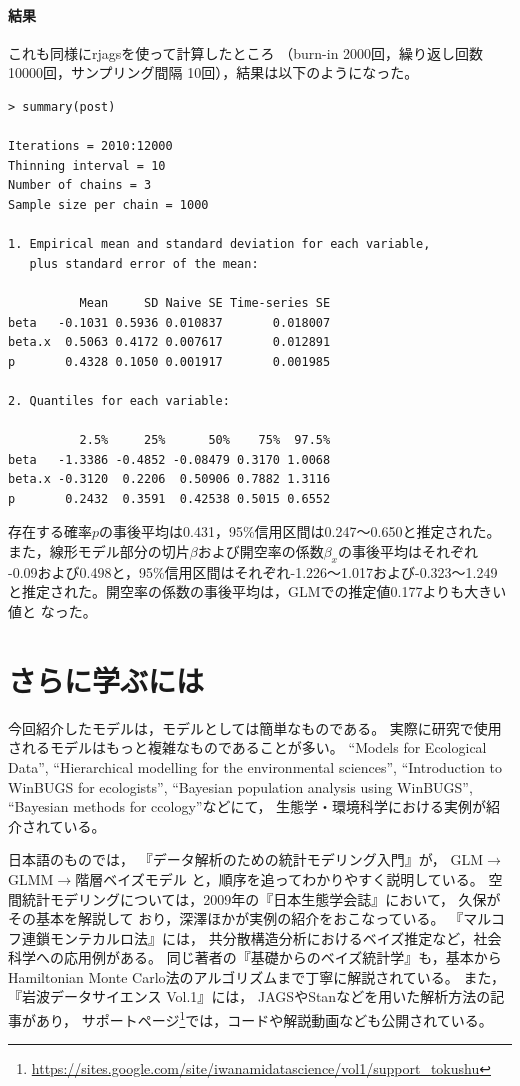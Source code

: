 \documentclass[11pt,uplatex]{jsarticle}
\begin{document}
\paragraph{結果}
これも同様に\textsf{rjags}を使って計算したところ
（burn-in 2000回，繰り返し回数 10000回，サンプリング間隔 10回），結果は以下のようになった。

\begin{lstlisting}
> summary(post)

Iterations = 2010:12000
Thinning interval = 10 
Number of chains = 3 
Sample size per chain = 1000 

1. Empirical mean and standard deviation for each variable,
   plus standard error of the mean:

          Mean     SD Naive SE Time-series SE
beta   -0.1031 0.5936 0.010837       0.018007
beta.x  0.5063 0.4172 0.007617       0.012891
p       0.4328 0.1050 0.001917       0.001985

2. Quantiles for each variable:

          2.5%     25%      50%    75%  97.5%
beta   -1.3386 -0.4852 -0.08479 0.3170 1.0068
beta.x -0.3120  0.2206  0.50906 0.7882 1.3116
p       0.2432  0.3591  0.42538 0.5015 0.6552

\end{lstlisting}
存在する確率$p$の事後平均は0.431，95\%信用区間は0.247〜0.650と推定された。
また，線形モデル部分の切片$\beta$および開空率の係数$\beta_{x}$の事後平均はそれぞれ
-0.09および0.498と，95\%信用区間はそれぞれ-1.226〜1.017および-0.323〜1.249
と推定された。開空率の係数の事後平均は，GLMでの推定値0.177よりも大きい値と
なった。


\section{さらに学ぶには}

今回紹介したモデルは，モデルとしては簡単なものである。
実際に研究で使用されるモデルはもっと複雑なものであることが多い。
``Models for Ecological Data''\cite{Clark},
``Hierarchical modelling for the environmental sciences''\cite{Clark_Gelfand},
``Introduction to WinBUGS for ecologists''\cite{IWE},
``Bayesian population analysis using WinBUGS''\cite{BPA},
``Bayesian methods for ccology''\cite{McCarthy}などにて，
生態学・環境科学における実例が紹介されている。

日本語のものでは，
『データ解析のための統計モデリング入門』\cite{Kubo:Modeling}が，
GLM$\rightarrow$GLMM$\rightarrow$階層ベイズモデル
と，順序を追ってわかりやすく説明している。
空間統計モデリングについては，2009年の『日本生態学会誌』において，
久保\cite{Kubo}がその基本を解説して
おり，深澤ほか\cite{Fukasawa_et_al}が実例の紹介をおこなっている。
『マルコフ連鎖モンテカルロ法』\cite{Toyoda}には，
共分散構造分析におけるベイズ推定など，社会科学への応用例がある。
同じ著者の『基礎からのベイズ統計学』\cite{Toyoda2015}も，基本から
Hamiltonian Monte Carlo法のアルゴリズムまで丁寧に解説されている。
また，『岩波データサイエンス Vol.1』\cite{Iwanami_vol1}には，
\textsf{JAGS}や\textsf{Stan}などを用いた解析方法の記事があり，
サポートページ\footnote{\url{https://sites.google.com/site/iwanamidatascience/vol1/support_tokushu}}では，コードや解説動画なども公開されている。
\end{document}
